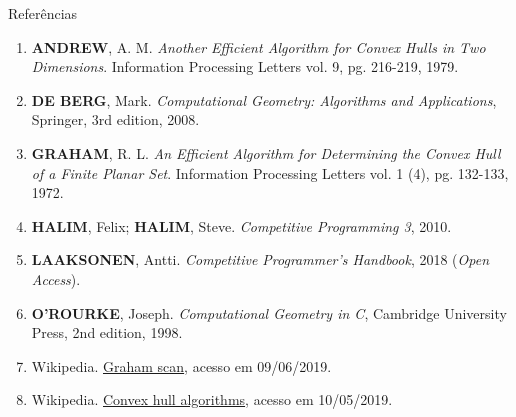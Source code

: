 \begin{frame}[fragile]{Referências}

    \begin{enumerate}

        \item \textbf{ANDREW}, A. M. \textit{Another Efficient Algorithm for Convex Hulls in Two Dimensions}. Information Processing Letters vol. 9, pg. 216-219, 1979.

        \item \textbf{DE BERG}, Mark. \textit{Computational Geometry: Algorithms and Applications}, Springer, 3rd edition, 2008.

        \item \textbf{GRAHAM}, R. L. \textit{An Efficient Algorithm for Determining the Convex
           Hull of a Finite Planar Set}. Information Processing Letters vol. 1 (4), pg. 132-133,
            1972.

        \item \textbf{HALIM}, Felix; \textbf{HALIM}, Steve. \textit{Competitive Programming 3}, 2010.
        \item \textbf{LAAKSONEN}, Antti. \textit{Competitive Programmer's Handbook}, 2018 (\textit{Open Access}).

        \item \textbf{O'ROURKE}, Joseph. \textit{Computational Geometry in C}, Cambridge University Press, 2nd edition, 1998. 

        \item Wikipedia. \href{https://en.wikipedia.org/wiki/Graham\_scan}{Graham scan}, acesso em
            09/06/2019.

        \item Wikipedia. \href{https://en.wikipedia.org/wiki/Convex\_hull\_algorithms}{Convex hull
            algorithms}, acesso em 10/05/2019.

    \end{enumerate}

\end{frame}
